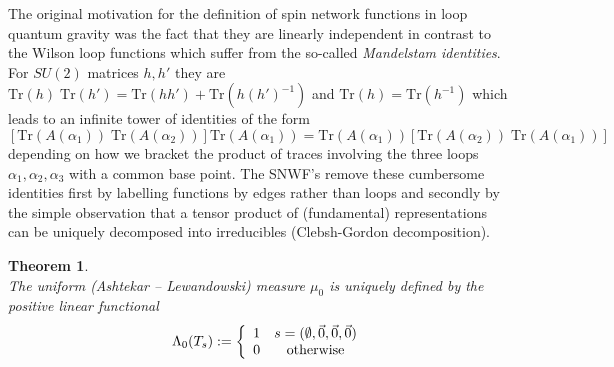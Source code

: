 \documentclass[12pt]{report}
\newtheorem{Theorem}{Theorem}[section]
\def\be{\begin{equation}}
\def\ee{\end{equation}}
\begin{document}
%
The original motivation for the definition of spin network functions
\cite{34} 
in loop quantum gravity was the fact that they are linearly independent
in contrast to the Wilson loop functions which suffer from the so-called 
{\it Mandelstam identities}. For $SU(2)$ matrices $h,h'$ they are 
$\mbox{Tr}(h)\;\mbox{Tr}(h')=\mbox{Tr}(hh')+\mbox{Tr}(h(h')^{-1})$
and $\mbox{Tr}(h)=\mbox{Tr}(h^{-1})$ which leads to an infinite 
tower of identities of the 
form 
\be \label{2.1.2.13}
[\mbox{Tr}(A(\alpha_1))\;\mbox{Tr}(A(\alpha_2))]\mbox{Tr}(A(\alpha_1))
=\mbox{Tr}(A(\alpha_1))[\mbox{Tr}(A(\alpha_2))\;\mbox{Tr}(A(\alpha_1))]
\ee
depending on how we bracket the product of traces involving the three
loops $\alpha_1,\alpha_2,\alpha_3$ with a common base point. The  
SNWF's remove these cumbersome identities first by labelling functions 
by edges rather than loops and secondly by the simple observation
that a tensor product of (fundamental) representations can be uniquely
decomposed into irreducibles (Clebsh-Gordon decomposition).
%
\begin{Theorem}
\label{th2.1.2.1a} ~~~~~~~~~\\
The uniform (Ashtekar -- Lewandowski) measure $\mu_0$ is uniquely defined 
by the positive linear functional \cite{33b}
\be \label{2.1.2.14} ~~~~~\\
\Lambda_0(T_s):=\left\{ \begin{array}{cc} 
1 & s=(\emptyset,\vec{0},\vec{0},\vec{0})\\
0 & \mbox{otherwise}
\end{array} \right.
\ee
\end{Theorem}
%
\end{document}
